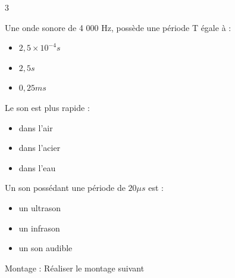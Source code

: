 \documentclass[11pt,a4paper]{article}
\begin{document}
\begin{multicols}{3}
\columnbreak

 Une onde sonore de 4 000 Hz, possède une période T égale à  : 
\begin{itemize}[label=$\square$]
	\item $2,5 \times 10^{-4} s $
	\item $2,5 s$
	\item $0,25 ms$
\end{itemize}

 Le son est plus rapide : 
\begin{itemize}[label=$\square$]
	\item dans l'air
	\item dans l'acier
	\item dans l'eau
\end{itemize}

  Un son possédant une période de $20 \mu s$ est : 
\begin{itemize}[label=$\square$]
	\item un ultrason
	\item un infrason
	\item un son audible 
\end{itemize}

\end{multicols}

\vfill 

\newpage 


 Montage : Réaliser le montage suivant \\
\vspace{5mm}
\begin{center}
\end{center}
\vspace{3mm}

\vspace{2cm}
\end{document}
